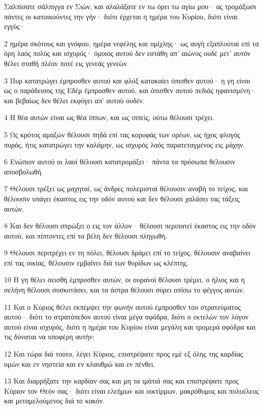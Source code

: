 \par Σαλπίσατε σάλπιγγα εν Σιών, και αλαλάξατε εν τω όρει τω αγίω μου· ας τρομάξωσι πάντες οι κατοικούντες την γήν· διότι έρχεται η ημέρα του Κυρίου, διότι είναι εγγύς·
\par 2 ημέρα σκότους και γνόφου, ημέρα νεφέλης και ομίχλης· ως αυγή εξαπλούται επί τα όρη λαός πολύς και ισχυρός· όμοιος αυτού δεν εστάθη απ' αιώνος ουδέ μετ' αυτόν θέλει σταθή πλέον ποτέ εις γενεάς γενεών.
\par 3 Πυρ κατατρώγει έμπροσθεν αυτού και φλόξ κατακαίει όπισθεν αυτού· η γη είναι ως ο παράδεισος της Εδέμ έμπροσθεν αυτού, και όπισθεν αυτού πεδιάς ηφανισμένη· και βεβαίως δεν θέλει εκφύγει απ' αυτού ουδέν.
\par 4 Η θέα αυτών είναι ως θέα ίππων, και ως ιππείς, ούτω θέλουσι τρέχει.
\par 5 Ως κρότος αμαξών θέλουσι πηδά επί τας κορυφάς των ορέων, ως ήχος φλογός πυρός, ήτις κατατρώγει την καλάμην, ως ισχυρός λαός παρατεταγμένος εις μάχην.
\par 6 Ενώπιον αυτού οι λαοί θέλουσι κατατρομάξει· πάντα τα πρόσωπα θέλουσιν αποσβολωθή.
\par 7 Θέλουσι τρέξει ως μαχηταί, ως άνδρες πολεμισταί θέλουσιν αναβή το τείχος, και θέλουσιν υπάγει έκαστος εις την οδόν αυτού και δεν θέλουσι χαλάσει τας τάξεις αυτών.
\par 8 Και δεν θέλουσι σπρώξει ο εις τον άλλον· θέλουσι περιπατεί έκαστος εις την οδόν αυτού, και πίπτοντες επί τα βέλη δεν θέλουσι πληγωθή.
\par 9 Θέλουσι περιτρέχει εν τη πόλει, θέλουσι δράμει επί το τείχος, θέλουσιν αναβαίνει επί τας οικίας, θέλουσιν εμβαίνει διά των θυρίδων ως κλέπτης.
\par 10 Η γη θέλει σεισθή έμπροσθεν αυτών, οι ουρανοί θέλουσι τρέμει, ο ήλιος και η σελήνη θέλουσι συσκοτάσει, και τα άστρα θέλουσι σύρει οπίσω το φέγγος αυτών.
\par 11 Και ο Κύριος θέλει εκπέμψει την φωνήν αυτού έμπροσθεν του στρατεύματος αυτού· διότι το στρατόπεδον αυτού είναι μέγα σφόδρα, διότι ο εκτελών τον λόγον αυτού είναι ισχυρός, διότι η ημέρα του Κυρίου είναι μεγάλη και τρομερά σφόδρα και τις δύναται να υποφέρη αυτήν;
\par 12 Και τώρα διά τούτο, λέγει Κύριος, επιστρέψατε προς εμέ εξ όλης της καρδίας υμών και εν νηστεία και εν κλαυθμώ και εν πένθει.
\par 13 Και διαρρήξατε την καρδίαν σας και μη τα ιμάτιά σας και επιστρέψατε προς Κύριον τον Θεόν σας· διότι είναι ελεήμων και οικτίρμων, μακρόθυμος και πολυέλεος και μεταμελούμενος διά το κακόν.

